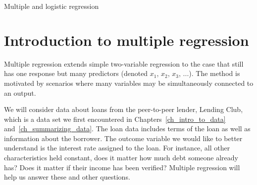 \begin{chapterpage}{Multiple and logistic regression}
  \label{multipleRegressionAndANOVA}
  \label{multipleAndLogisticRegression}
  \label{ch_regr_mult_and_log}
\end{chapterpage}
\renewcommand{\chapterfolder}{ch_regr_mult_and_log}





\section{Introduction to multiple regression}
\label{introductionToMultipleRegression}


Multiple regression extends simple two-variable regression to the case that still has one response but many predictors (denoted $x_1$, $x_2$, $x_3$, ...). The method is motivated by scenarios where many variables may be simultaneously connected to an output.


\newcommand{\loNcomma}{10,000}
\newcommand{\loN}{10000}

We will consider data about loans from the peer-to-peer lender,
Lending Club, which is a data set we first encountered in
Chapters~\ref{ch_intro_to_data}
and~\ref{ch_summarizing_data}.
The loan data includes terms of the loan as well as
information about the borrower.
The outcome variable we would like to better understand
is the interest rate assigned to the loan.
For instance, all other characteristics held constant,
does it matter how much debt someone already has?
Does it matter if their income has been verified?
Multiple regression will help us answer these and other questions.

